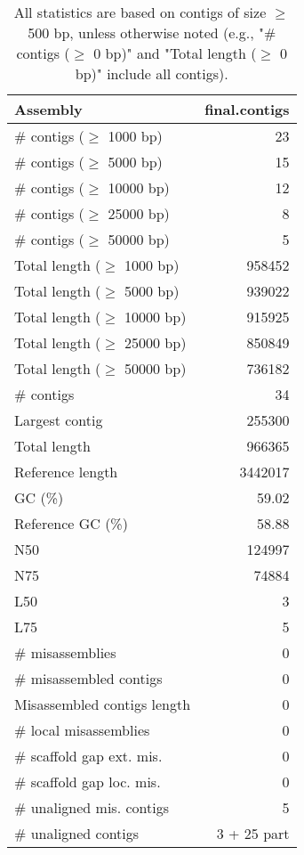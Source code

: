 \documentclass[12pt,a4paper]{article}
\begin{document}
\begin{table}[ht]
\begin{center}
\caption{All statistics are based on contigs of size $\geq$ 500 bp, unless otherwise noted (e.g., "\# contigs ($\geq$ 0 bp)" and "Total length ($\geq$ 0 bp)" include all contigs).}
\begin{tabular}{|l*{1}{|r}|}
\hline
Assembly & final.contigs \\ \hline
\# contigs ($\geq$ 1000 bp) & 23 \\ \hline
\# contigs ($\geq$ 5000 bp) & 15 \\ \hline
\# contigs ($\geq$ 10000 bp) & 12 \\ \hline
\# contigs ($\geq$ 25000 bp) & 8 \\ \hline
\# contigs ($\geq$ 50000 bp) & 5 \\ \hline
Total length ($\geq$ 1000 bp) & 958452 \\ \hline
Total length ($\geq$ 5000 bp) & 939022 \\ \hline
Total length ($\geq$ 10000 bp) & 915925 \\ \hline
Total length ($\geq$ 25000 bp) & 850849 \\ \hline
Total length ($\geq$ 50000 bp) & 736182 \\ \hline
\# contigs & 34 \\ \hline
Largest contig & 255300 \\ \hline
Total length & 966365 \\ \hline
Reference length & 3442017 \\ \hline
GC (\%) & 59.02 \\ \hline
Reference GC (\%) & 58.88 \\ \hline
N50 & 124997 \\ \hline
N75 & 74884 \\ \hline
L50 & 3 \\ \hline
L75 & 5 \\ \hline
\# misassemblies & 0 \\ \hline
\# misassembled contigs & 0 \\ \hline
Misassembled contigs length & 0 \\ \hline
\# local misassemblies & 0 \\ \hline
\# scaffold gap ext. mis. & 0 \\ \hline
\# scaffold gap loc. mis. & 0 \\ \hline
\# unaligned mis. contigs & 5 \\ \hline
\# unaligned contigs & 3 + 25 part \\ \hline

\end{tabular}
\end{center}
\end{table}
\end{document}
